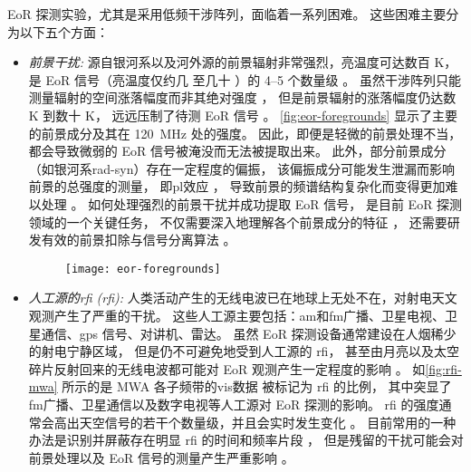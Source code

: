 EoR 探测实验，尤其是采用低频干涉阵列，面临着一系列困难。
这些困难主要分为以下五个方面：
\begin{itemize}
\item
\emph{前景干扰:}
源自银河系以及河外源的前景辐射非常强烈，亮温度可达数百 \si{\kelvin}，
是 EoR 信号（亮温度仅约几 \si{\mK} 至几十 \si{\mK}）的 \numrange{4}{5} 个数量级
\cite{morales2010}。
虽然干涉阵列只能测量辐射的空间涨落幅度而非其绝对强度 \cite{braun1985}，
但是前景辐射的涨落幅度仍达数 \si{\kelvin} 到数十 \si{\kelvin}，
远远压制了待测 EoR 信号 \cite{zaroubi2013}。
\autoref{fig:eor-foregrounds} 显示了主要的前景成分及其在 \SI{120}{\MHz} 处的强度。
因此，即便是轻微的前景处理不当，都会导致微弱的 EoR 信号被淹没而无法被提取出来。
此外，部分前景成分（如银河系\ac{rad-syn}）存在一定程度的偏振，
该偏振成分可能发生泄漏而影响前景的总强度的测量，
即\ac{pl}效应 \cite{cotton1999,reid2008}，
导致前景的频谱结构复杂化而变得更加难以处理
\cite{jelic2014,asad2015,asad2016,asad2018,gehlot2018}。
如何处理强烈的前景干扰并成功提取 EoR 信号，
是目前 EoR 探测领域的一个关键任务，
不仅需要深入地理解各个前景成分的特征
\cite{jelic2008,jelic2010,wang2010,liu2012,offringa2016,
  carroll2016,murray2017,procopio2017,spinelli2018}，
还需要研发有效的前景扣除与信号分离算法
\cite{wang2006,jelic2008,harker2009,liu2009fgrm,chapman2012,chapman2013,
  gu2013,wang2013,bonaldi2015,chapman2015,chapman2016,mertens2018}。

\begin{figure}[htp]
  \centering
  \texttt{[image: eor-foregrounds]}
  \label{fig:eor-foregrounds}
\end{figure}

\item
\emph{人工源的\acl{rfi} (\ac{rfi}):}
人类活动产生的无线电波已在地球上无处不在，对射电天文观测产生了严重的干扰。
这些人工源主要包括：\ac{am}和\ac{fm}广播、卫星电视、卫星通信、\ac{gps} 信号、对讲机、雷达。
虽然 EoR 探测设备通常建设在人烟稀少的射电宁静区域，
但是仍不可避免地受到人工源的 \ac{rfi}，
甚至由月亮以及太空碎片反射回来的无线电波都可能对 EoR 观测产生一定程度的影响
\cite{mcKinley2013,tingay2013rfi}。
如\autoref{fig:rfi-mwa} 所示的是 MWA 各子频带的\ac{vis}数据
被标记为 \ac{rfi} 的比例，
其中突显了\ac{fm}广播、卫星通信以及数字电视等人工源对 EoR 探测的影响。
\ac{rfi} 的强度通常会高出天空信号的若干个数量级，并且会实时发生变化 \cite{bentum2011}。
目前常用的一种办法是识别并屏蔽存在明显 \ac{rfi} 的时间和频率片段
\cite{fridman2001,offringa2010,offringa2012,prasad2012,akeret2017}，
但是残留的干扰可能会对前景处理以及 EoR 信号的测量产生严重影响 \cite{offringa2015}。


\end{itemize}
